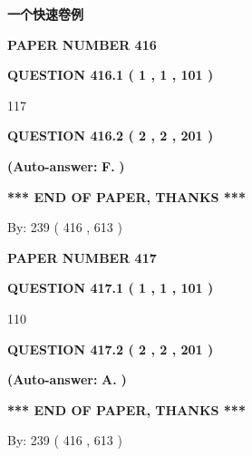 \documentclass{ctexart}
\begin{document}
 
 
 
 
   
   
   
   
   
   
{\LARGE {\textbf{ 一个快速卷例}}}
   
   
   
   
\setcounter{page}{ 
   416001 } 
   
   
 {\textbf{ \Large{ PAPER NUMBER  416  }}}
   
   
   
   
  
  
{\textbf{\large{QUESTION
416.1 
 ( 1 , 1 , 101 )
}}}

117
  
  
{\textbf{\large{QUESTION
416.2 
 ( 2 , 2 , 201 )
}}}
 
 
{\textbf{(Auto-answer:}}
{\textbf{\large{
F.}}}
{\textbf{)}}
 
 
   
   
   
   
\vspace{1.0in} 
{\textbf{\large{ *** END OF PAPER, THANKS *** }}} 
   
   
\hspace{1.0in} By: 
 239 ( 416 ,  613 )
   
   
   
   
\newpage 
\setcounter{page}{ 
   417001 } 
   
   
 {\textbf{ \Large{ PAPER NUMBER  417  }}}
   
   
   
   
  
  
{\textbf{\large{QUESTION
417.1 
 ( 1 , 1 , 101 )
}}}

110
  
  
{\textbf{\large{QUESTION
417.2 
 ( 2 , 2 , 201 )
}}}
 
 
{\textbf{(Auto-answer:}}
{\textbf{\large{
A.}}}
{\textbf{)}}
 
 
   
   
   
   
\vspace{1.0in} 
{\textbf{\large{ *** END OF PAPER, THANKS *** }}} 
   
   
\hspace{1.0in} By: 
 239 ( 416 ,  613 )
   
   
   
   
\newpage 
\setcounter{page}{ 
   418001 } 
   
\end{document}
